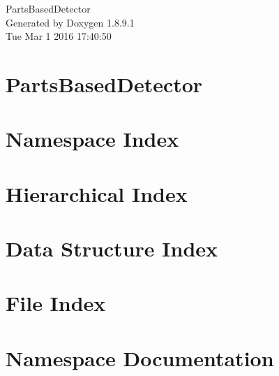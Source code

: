 \documentclass[twoside]{book}
\newcommand{\+}{\discretionary{\mbox{\scriptsize$\hookleftarrow$}}{}{}}
\newcommand{\clearemptydoublepage}{%
  \newpage{\pagestyle{empty}\cleardoublepage}%
}
\begin{document}
\hypersetup{pageanchor=false,
             bookmarks=true,
             bookmarksnumbered=true,
             pdfencoding=unicode
            }
\begin{titlepage}
\vspace*{7cm}
\begin{center}%
{\Large Parts\+Based\+Detector }\\
\vspace*{1cm}
{\large Generated by Doxygen 1.8.9.1}\\
\vspace*{0.5cm}
{\small Tue Mar 1 2016 17:40:50}\\
\end{center}
\end{titlepage}
\clearemptydoublepage
\tableofcontents
\clearemptydoublepage
{}
\hypersetup{pageanchor=true}

\chapter{Parts\+Based\+Detector}
\label{index}\hypertarget{index}{}
\chapter{Namespace Index}

\chapter{Hierarchical Index}

\chapter{Data Structure Index}

\chapter{File Index}

\chapter{Namespace Documentation}

\end{document}
